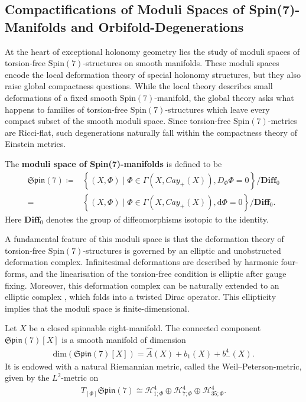 \documentclass[psamsfonts]{amsart}
\theoremstyle{plain}
\theoremstyle{definition}{
\newtheorem{defi}{Definition}[section]
\newtheorem{ass}{Assumption}
\newtheorem*{nota}{Notation}}
\theoremstyle{remark}{
\newtheorem{rem}{Remark}
\newtheorem{ex}{Example}}
\theoremstyle{plain}{
\newtheorem{thm}{Theorem}[section]
\newtheorem{lem}{Lemma}[section]
\newtheorem{cor}{Corollary}[section]
\newtheorem{prop}{Proposition}[section]
\newtheorem{con}{Conjecture}[section]}
\newcommand{\m}[1]{{\mathrm{#1}}}
\newcommand{\cat}[1]{\textbf{#1}}
\begin{document}
\subsection{Compactifications of Moduli Spaces of Spin(7)-Manifolds and Orbifold-Degenerations}
\label{Compactifications of Moduli Spaces of Spin(7)-Manifolds and Orbifold-Degenerations}

At the heart of exceptional holonomy geometry lies the study of moduli spaces of torsion-free $\m{Spin}(7)$-structures on smooth manifolds. These moduli spaces encode the local deformation theory of special holonomy structures, but they also raise global compactness questions. While the local theory describes small deformations of a fixed smooth $\m{Spin}(7)$-manifold, the global theory asks what happens to families of torsion-free $\m{Spin}(7)$-structures which leave every compact subset of the smooth moduli space. Since torsion-free $\m{Spin}(7)$-metrics are Ricci-flat, such degenerations naturally fall within the compactness theory of Einstein metrics.

\begin{defi}
    The \textbf{moduli space of Spin(7)-manifolds} is defined to be 
    \begin{align*}
        \mathfrak{Spin}(7)\coloneqq&\left\{(X,\Phi)\mid \Phi\in\Gamma(X,Cay_+(X)),D_\Phi\Phi=0\right\}/\cat{Diff}_0\\
        =&\left\{(X,\Phi)\mid \Phi\in\Gamma(X,Cay_+(X)),\m{d}\Phi=0\right\}/\cat{Diff}_0.
    \end{align*}
Here $\cat{Diff}_0$ denotes the group of diffeomorphisms isotopic to the identity. 
\end{defi}

A fundamental feature of this moduli space is that the deformation theory of torsion-free $\m{Spin}(7)$-structures is governed by an elliptic and unobstructed deformation complex. Infinitesimal deformations are described by harmonic four-forms, and the linearisation of the torsion-free condition is elliptic after gauge fixing. Moreover, this deformation complex can be naturally extended to an elliptic complex \cite[Thm. 7.2]{goto2002deformations}, which folds into a twisted Dirac operator. This ellipticity implies that the moduli space is finite-dimensional.

\begin{thm}\cite[Thm. D]{Joyce1996b}
    Let $X$ be a closed spinnable eight-manifold. The connected component $\mathfrak{Spin}(7)[X]$ is a smooth manifold of dimension 
    \begin{align*}
        \m{dim}(\mathfrak{Spin}(7)[X])=\hat{A}(X)+b_1(X)+b^4_-(X).
    \end{align*}
    It is endowed with a natural Riemannian metric, called the Weil--Peterson-metric, given by the $L^2$-metric on
    \begin{align*}
        T_{[\Phi]}\mathfrak{Spin}(7)\cong
        \mathcal{H}^4_{1;\Phi}\oplus\mathcal{H}^4_{7;\Phi}\oplus \mathcal{H}^4_{35;\Phi}.
    \end{align*}
\end{thm}
\end{document}
